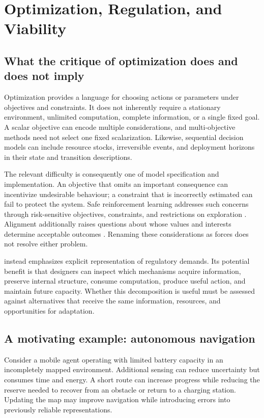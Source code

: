\section{Optimization, Regulation, and Viability}
\label{sec:optimization_equilibrium}

\subsection{What the critique of optimization does and does not imply}
Optimization provides a language for choosing actions or parameters under objectives and constraints. It does not inherently require a stationary environment, unlimited computation, complete information, or a single fixed goal. A scalar objective can encode multiple considerations, and multi-objective methods need not select one fixed scalarization. Likewise, sequential decision models can include resource stocks, irreversible events, and deployment horizons in their state and transition descriptions.

The relevant difficulty is consequently one of model specification and implementation. An objective that omits an important consequence can incentivize undesirable behaviour; a constraint that is incorrectly estimated can fail to protect the system. Safe reinforcement learning addresses such concerns through risk-sensitive objectives, constraints, and restrictions on exploration \citep{garcia2015saferl}. Alignment additionally raises questions about whose values and interests determine acceptable outcomes \citep{gabriel2020artificial}. Renaming these considerations as forces does not resolve either problem.

\uvif{} instead emphasizes explicit representation of regulatory demands. Its potential benefit is that designers can inspect which mechanisms acquire information, preserve internal structure, consume computation, produce useful action, and maintain future capacity. Whether this decomposition is useful must be assessed against alternatives that receive the same information, resources, and opportunities for adaptation.

\subsection{A motivating example: autonomous navigation}
Consider a mobile agent operating with limited battery capacity in an incompletely mapped environment. Additional sensing can reduce uncertainty but consumes time and energy. A short route can increase progress while reducing the reserve needed to recover from an obstacle or return to a charging station. Updating the map may improve navigation while introducing errors into previously reliable representations.

